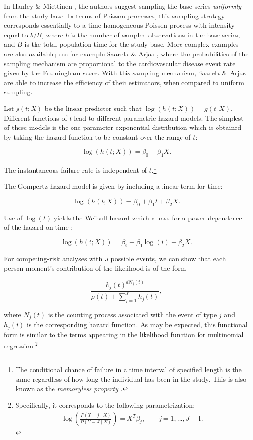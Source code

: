 \documentclass[
]{jss}
\begin{document}
In Hanley \& Miettinen \citeyearpar{hanley2009fitting}, the authors
suggest sampling the base series \emph{uniformly} from the study base.
In terms of Poisson processes, this sampling strategy corresponds
essentially to a time-homogeneous Poisson process with intensity equal
to \(b/B\), where \(b\) is the number of sampled observations in the
base series, and \(B\) is the total population-time for the study base.
More complex examples are also available; see for example Saarela \&
Arjas \citeyearpar{saarela2015non}, where the probabilities of the
sampling mechanism are proportional to the cardiovascular disease event
rate given by the Framingham score. With this sampling mechanism,
Saarela \& Arjas are able to increase the efficiency of their
estimators, when compared to uniform sampling.

Let \(g(t; X)\) be the linear predictor such that
\(\log(h(t;X)) = g(t; X)\). Different functions of \(t\) lead to
different parametric hazard models. The simplest of these models is the
one-parameter exponential distribution which is obtained by taking the
hazard function to be constant over the range of \(t\):

\[ \log(h(t; X)) = \beta_0 + \beta_1 X.\]

The instantaneous failure rate is independent of
\(t\).\footnote{The conditional chance of failure in a time interval of specified length is the same regardless of how long the individual has been in the study. This is also known as the \textit{memoryless property} \citep{kalbfleisch2011statistical}.}

The Gompertz hazard model is given by including a linear term for time:

\[ \log(h(t; X)) = \beta_0 + \beta_1 t + \beta_2 X.\]

Use of \(\log(t)\) yields the Weibull hazard which allows for a power
dependence of the hazard on time \citep{kalbfleisch2011statistical}:

\[ \log(h(t; X)) = \beta_0 + \beta_1 \log(t) + \beta_2 X. \]

For competing-risk analyses with \(J\) possible events, we can show that
each person-moment's contribution of the likelihood is of the form

\[\frac{h_j(t)^{dN_j(t)}}{\rho(t) + \sum_{j=1}^Jh_j(t)},\]

where \(N_j(t)\) is the counting process associated with the event of
type \(j\) and \(h_j(t)\) is the corresponding hazard function. As may
be expected, this functional form is similar to the terms appearing in
the likelihood function for multinomial
regression.\footnote{Specifically, it corresponds to the following parametrization: \begin{align*} \log\left(\frac{P(Y=j \mid X)}{P(Y = J \mid X)}\right) = X^T\beta_j, \qquad j = 1,\ldots, J-1.\end{align*}}
\end{document}
